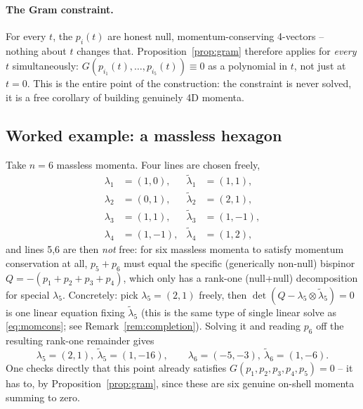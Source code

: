\documentclass[11pt]{article}
\newcommand{\lam}{\lambda}
\newcommand{\lt}{\tilde\lambda}
\theoremstyle{definition}
\begin{document}
\paragraph{The Gram constraint.} For every $t$, the $p_i(t)$ are honest null, momentum-conserving
4-vectors -- nothing about $t$ changes that. Proposition~\ref{prop:gram} therefore applies for
\emph{every} $t$ simultaneously: $G(p_{i_1}(t),\dots,p_{i_5}(t)) \equiv 0$ as a polynomial in $t$,
not just at $t=0$. This is the entire point of the construction: the constraint is never solved,
it is a free corollary of building genuinely 4D momenta.

\subsection{Worked example: a massless hexagon}
\label{sec:masslessexample}

Take $n=6$ massless momenta. Four lines are chosen freely,
\begin{equation}
\begin{aligned}
\lam_1&=(1,0), & \lt_1&=(1,1), \\
\lam_2&=(0,1), & \lt_2&=(2,1), \\
\lam_3&=(1,1), & \lt_3&=(1,-1), \\
\lam_4&=(1,-1), & \lt_4&=(1,2),
\end{aligned}
\end{equation}
and lines 5,6 are then \emph{not} free: for six massless momenta to satisfy momentum
conservation at all, $p_5+p_6$ must equal the specific (generically non-null) bispinor
$Q = -(p_1+p_2+p_3+p_4)$, which only has a rank-one (null+null) decomposition for special
$\lam_5$. Concretely: pick $\lam_5=(2,1)$ freely, then $\det(Q-\lam_5\otimes\lt_5)=0$ is one
linear equation fixing $\lt_5$ (this is the same type of single linear solve as
\eqref{eq:momcons}; see Remark~\ref{rem:completion}). Solving it and reading $p_6$ off the
resulting rank-one remainder gives
\begin{equation}
\lam_5=(2,1),\ \lt_5=(1,-16), \qquad \lam_6=(-5,-3),\ \lt_6=(1,-6).
\end{equation}
One checks directly that this point already satisfies $G(p_1,p_2,p_3,p_4,p_5)=0$ -- it has to,
by Proposition~\ref{prop:gram}, since these are six genuine on-shell momenta summing to zero.
\end{document}
